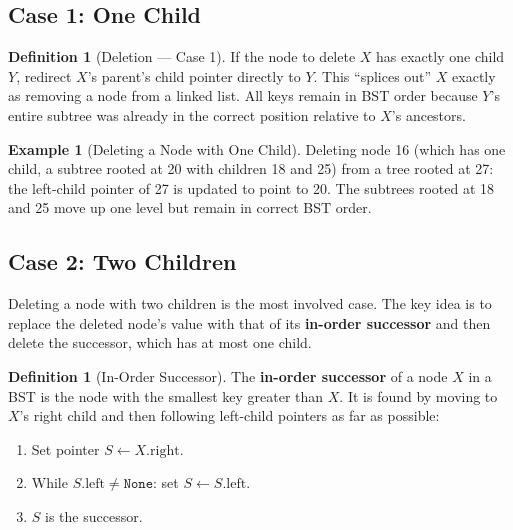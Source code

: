 \documentclass[11pt, a4paper, notitlepage]{report}
\theoremstyle{definition}
\newtheorem{definition}[theorem]{Definition}
\theoremstyle{remark}
\theoremstyle{definition}
\newtheorem{example}[theorem]{Example}
\begin{document}
\subsection{Case 1: One Child}
\label{subsec:delete-case1}

\begin{definition}[Deletion --- Case 1]
If the node to delete $X$ has exactly one child $Y$, redirect $X$'s parent's child pointer
directly to $Y$.  This ``splices out'' $X$ exactly as removing a node from a linked list.
All keys remain in BST order because $Y$'s entire subtree was already in the correct position
relative to $X$'s ancestors.
\end{definition}

\begin{example}[Deleting a Node with One Child]
\label{ex:delete-one-child}
Deleting node 16 (which has one child, a subtree rooted at 20 with children 18 and 25) from
a tree rooted at 27: the left-child pointer of 27 is updated to point to 20.  The subtrees
rooted at 18 and 25 move up one level but remain in correct BST order.
\end{example}

\subsection{Case 2: Two Children}
\label{subsec:delete-case2}

Deleting a node with two children is the most involved case.  The key idea is to replace the
deleted node's value with that of its \textbf{in-order successor} and then delete the
successor, which has at most one child.

\begin{definition}[In-Order Successor]
\label{def:successor}
The \textbf{in-order successor} of a node $X$ in a BST is the node with the smallest key
greater than $X$.  It is found by moving to $X$'s right child and then following left-child
pointers as far as possible:
\begin{enumerate}
  \item Set pointer $S \leftarrow X.\text{right}$.
  \item While $S.\text{left} \neq \texttt{None}$: set $S \leftarrow S.\text{left}$.
  \item $S$ is the successor.
\end{enumerate}
\end{definition}
\end{document}
